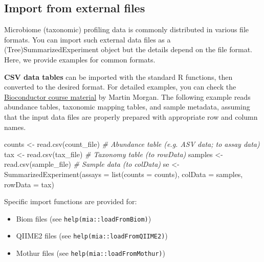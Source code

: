 \documentclass[
]{book}
\newenvironment{Shaded}{\begin{snugshade}}{\end{snugshade}}
\newcommand{\AttributeTok}[1]{\textcolor[rgb]{0.77,0.63,0.00}{#1}}
\newcommand{\CommentTok}[1]{\textcolor[rgb]{0.56,0.35,0.01}{\textit{#1}}}
\newcommand{\FunctionTok}[1]{\textcolor[rgb]{0.00,0.00,0.00}{#1}}
\newcommand{\NormalTok}[1]{#1}
\newcommand{\OtherTok}[1]{\textcolor[rgb]{0.56,0.35,0.01}{#1}}
\providecommand{\tightlist}{%
  \setlength{\itemsep}{0pt}\setlength{\parskip}{0pt}}
\begin{document}
\hypertarget{import-from-external-files}{%
\subsection{Import from external files}\label{import-from-external-files}}

Microbiome (taxonomic) profiling data is commonly distributed in
various file formats. You can import such external data files as a
(Tree)SummarizedExperiment object but the details depend on the file
format. Here, we provide examples for common formats.

\textbf{CSV data tables} can be imported with the standard R functions,
then converted to the desired format. For detailed examples, you can
check the \href{https://bioconductor.org/help/course-materials/2019/BSS2019/04_Practical_CoreApproachesInBioconductor.html}{Bioconductor course
material}
by Martin Morgan. The following example reads abundance tables,
taxonomic mapping tables, and sample metadata, assuming that the
input data files are properly prepared with appropriate row and
column names.

\begin{Shaded}
\begin{Highlighting}[]
\NormalTok{counts  }\OtherTok{\textless{}{-}} \FunctionTok{read.csv}\NormalTok{(count\_file)   }\CommentTok{\# Abundance table (e.g. ASV data; to assay data)}
\NormalTok{tax     }\OtherTok{\textless{}{-}} \FunctionTok{read.csv}\NormalTok{(tax\_file)     }\CommentTok{\# Taxonomy table (to rowData)}
\NormalTok{samples }\OtherTok{\textless{}{-}} \FunctionTok{read.csv}\NormalTok{(sample\_file)  }\CommentTok{\# Sample data (to colData)}
\NormalTok{se }\OtherTok{\textless{}{-}} \FunctionTok{SummarizedExperiment}\NormalTok{(}\AttributeTok{assays =} \FunctionTok{list}\NormalTok{(}\AttributeTok{counts =}\NormalTok{ counts),}
                           \AttributeTok{colData =}\NormalTok{ samples,}
                           \AttributeTok{rowData =}\NormalTok{ tax)}
\end{Highlighting}
\end{Shaded}

Specific import functions are provided for:

\begin{itemize}
\tightlist
\item
  Biom files (see \texttt{help(mia::loadFromBiom)})
\item
  QIIME2 files (see \texttt{help(mia::loadFromQIIME2)})
\item
  Mothur files (see \texttt{help(mia::loadFromMothur)})
\end{itemize}
\end{document}
